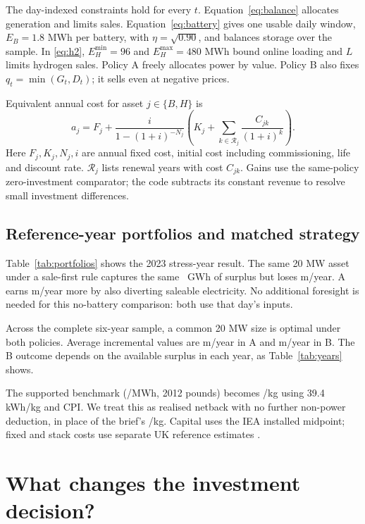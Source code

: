 The day-indexed constraints hold for every \(t\). Equation~\eqref{eq:balance}
allocates generation and limits sales. Equation~\eqref{eq:battery} gives one
usable daily window, \(E_B=1.8\) MWh per battery, with
\(\eta=\sqrt{0.90}\), and balances storage over the sample.
In \eqref{eq:h2}, \(E_H^{\min}=96\) and \(E_H^{\max}=480\) MWh
bound online loading and \(L\) limits hydrogen sales.
Policy A freely allocates power by value. Policy B also fixes
\(q_t=\min(G_t,D_t)\); it sells even at negative prices.

Equivalent annual cost for asset \(j\in\{B,H\}\) is
\begin{equation}
a_j=F_j+\frac{i}{1-(1+i)^{-N_j}}
\left(K_j+\sum_{k\in\mathcal R_j}\frac{C_{jk}}{(1+i)^k}\right).
\label{eq:eac}
\end{equation}
Here \(F_j,K_j,N_j,i\) are annual fixed cost, initial cost including
commissioning, life and discount rate. \(\mathcal R_j\) lists renewal years
with cost \(C_{jk}\). Gains use the same-policy zero-investment comparator;
the code subtracts its constant revenue to resolve small investment differences.

\subsection{Reference-year portfolios and matched strategy}
Table~\ref{tab:portfolios} shows the 2023 stress-year result. The same
20 MW asset under a sale-first rule captures the same \Capture~GWh of surplus
but loses \gbp\SimpleLoss m/year. A earns \gbp\RuleAdvantage m/year more
by also diverting saleable electricity. No additional foresight is needed for
this no-battery comparison: both use that day's inputs.


Across the complete six-year sample, a common 20 MW size is optimal under
both policies. Average incremental values are \gbp\MeanA m/year in A and
\gbp\MeanB m/year in B. The B outcome depends on the available surplus
in each year, as Table~\ref{tab:years} shows.

The supported benchmark (/MWh, 2012 pounds) becomes
\gbp\Netback/kg using 39.4 kWh/kg and CPI. We treat this as realised netback
with no further non-power deduction, in place of the brief's /kg.
Capital uses the IEA installed midpoint; fixed and stack costs use separate
UK reference estimates \cite{har,iea,beis,basis}.

\samplebreak
\section{What changes the investment decision?}

